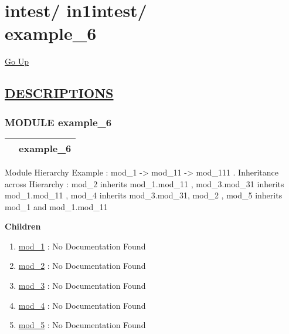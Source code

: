 \chapter*{\color{headfile}
{\large intest\slash\hspace{0pt}}
{\large in1intest\slash\hspace{0pt}}
 \\
example_6
}
\hypertarget{ecldoc:toc:intest.in1intest.example_6}{}
\hyperlink{ecldoc:toc:root/intest/in1intest}{Go Up}


\section*{\underline{\textsf{DESCRIPTIONS}}}
\subsection*{\textsf{\colorbox{headtoc}{\color{white} MODULE}
example\_6}}

\hypertarget{ecldoc:intest.in1intest.example_6}{}

{\renewcommand{\arraystretch}{1.5}
\begin{tabularx}{\textwidth}{|>{\raggedright\arraybackslash}l|X|}
\hline
\hspace{0pt}\mytexttt{\color{red} } & \textbf{example\_6} \\
\hline
\end{tabularx}
}

\par





Module Hierarchy Example : mod\_1 -> mod\_11 -> mod\_111 . Inheritance across Hierarchy : mod\_2 inherits mod\_1.mod\_11 , mod\_3.mod\_31 inherits mod\_1.mod\_11 , mod\_4 inherits mod\_3.mod\_31, mod\_2 , mod\_5 inherits mod\_1 and mod\_1.mod\_11







\textbf{Children}
\begin{enumerate}
\item \hyperlink{ecldoc:intest.in1intest.example_6.mod_1}{mod\_1}
: No Documentation Found
\item \hyperlink{ecldoc:intest.in1intest.example_6.mod_2}{mod\_2}
: No Documentation Found
\item \hyperlink{ecldoc:intest.in1intest.example_6.mod_3}{mod\_3}
: No Documentation Found
\item \hyperlink{ecldoc:intest.in1intest.example_6.mod_4}{mod\_4}
: No Documentation Found
\item \hyperlink{ecldoc:intest.in1intest.example_6.mod_5}{mod\_5}
: No Documentation Found
\end{enumerate}

